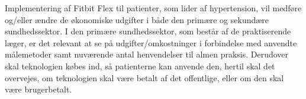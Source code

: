 Implementering af Fitbit Flex til patienter, som lider af hypertension, vil medføre og/eller ændre de økonomiske udgifter i både den primære og sekundære sundhedssektor. I den primære sundhedssektor, som består af de praktiserende læger, er det relevant at se på udgifter/omkostninger i forbindelse med anvendte målemetoder samt nuværende antal henvendelser til almen praksis. Derudover skal teknologien købes ind, så patienterne kan anvende den, hertil skal det overvejes, om teknologien skal være betalt af det offentlige, eller om den skal være brugerbetalt.




\begin{comment}
Hvad koster et Fitbit Flex? 
Hvilke besparelser tilbydes der så sundhedsektoren? 

Hvad koster det så at introducere patienterne til teknologien? 
	Hvad dækker den her introduktion minimum over, for at kunne anvende armbåndet? (Anvendelse af app og hvordan den skal oplades.)
	
Hvad koster det hvis de har spørgsmål vedr. teknologien? 

Langsigtet omkostninger - hvis behandlingen hjælper/ikke hjælper
- Besparelser vedr medicinering 
- Forebyggelse af behandlingsresistent hypertension = $$$$



EVT: Dags-takster i sekundær sektor (Ambulant).



En model i almen praktsis for implementeringen af aktivitetsarmbånd?

Honorartabel = \citep{honorartabel2016}
\end{comment}